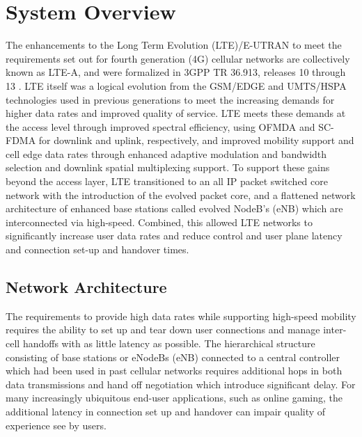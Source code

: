 \section{System Overview}
\label{sys-overview}
The enhancements to the Long Term Evolution (LTE)/E-UTRAN to meet the requirements set out for fourth generation (4G) cellular networks are collectively known as LTE-A, and were formalized in 3GPP TR 36.913, releases 10 through 13 \cite{tr36913}.  LTE itself was a logical evolution from the GSM/EDGE and UMTS/HSPA technologies used in previous generations to meet the increasing demands for higher data rates and improved quality of service. LTE meets these demands at the access level through improved spectral efficiency, using OFMDA and SC-FDMA for downlink and uplink, respectively, and improved mobility support and cell edge data rates through enhanced adaptive modulation and bandwidth selection and downlink spatial multiplexing support. To support these gains beyond the access layer, LTE transitioned to an all IP packet switched core network with the introduction of the evolved packet core, and a flattened network architecture of enhanced base stations called evolved NodeB's (eNB) which are interconnected via high-speed.  Combined, this allowed LTE networks to significantly increase user data rates and reduce control and user plane latency and connection set-up and handover times.  

\subsection{Network Architecture}
\label{net-arch}
The requirements to provide high data rates while supporting high-speed mobility requires the ability to set up and tear down user connections and manage inter-cell handoffs with as little latency as possible.  The hierarchical structure consisting of base stations or eNodeBs (eNB) connected to a central controller which had been used in past cellular networks requires additional hops in both data transmissions and hand off negotiation which introduce significant delay.  For many increasingly ubiquitous end-user applications, such as online gaming, the additional latency in connection set up and handover can impair quality of experience see by users.  

